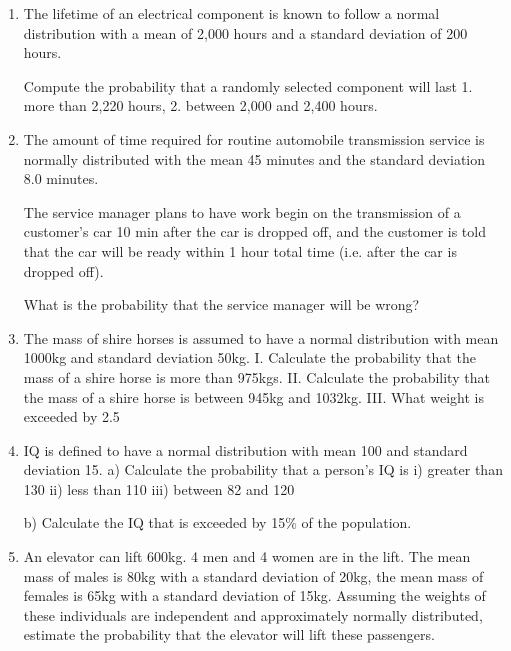 \documentclass[]{article}
\begin{document}
\begin{enumerate}
	\item The lifetime of an electrical component is known to follow a normal distribution with a mean of 2,000 hours and a standard deviation of 200 hours.  
	
	Compute the probability that a randomly selected component will last 
	1.	more than 2,220 hours, 
	2.	between 2,000 and 2,400 hours. 
	

	\item The amount of time required for routine automobile transmission service is normally distributed with the mean 45 minutes and the standard deviation 8.0 minutes. 
	
	The service manager plans to have work begin on the transmission of a customer’s car 10 min after the car is dropped off, and the customer is told that the car will be ready within 1 hour total time (i.e. after  the car is dropped off). 
	
	What is the probability that the service manager will be wrong?

	\item  The mass of shire horses is assumed to have a normal distribution with mean 1000kg and standard deviation 50kg. 
	I.	Calculate the probability that the mass of a shire horse is more than 975kgs.
	II.	Calculate the probability that the mass of a shire horse is between 945kg and 1032kg.                    
	III.	What weight is exceeded by 2.5%
	 \item IQ  is defined to have a normal distribution with mean 100 and standard deviation 15. 
	a) Calculate the probability that a person’s IQ is
	i) greater than 130
	ii) less than 110
	iii) between 82 and 120
	
	b) Calculate the IQ that is exceeded by 15\% of the population.

	\item  An elevator can lift 600kg. 4 men and 4 women are in the lift. The mean mass of males is 80kg with a standard deviation of 20kg, the mean mass of females is 65kg with a standard deviation of 15kg. Assuming the weights of these individuals are independent and approximately normally distributed, estimate the probability that the elevator will lift these passengers. 
	

\end{enumerate}
\end{document}
